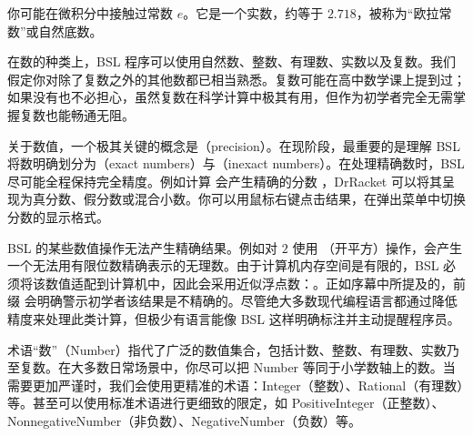 \begin{notebox}[常数 $e$（自然常数）]
你可能在微积分中接触过常数 $e$。它是一个实数，约等于 $2.718$，被称为“欧拉常数”或自然底数。
\end{notebox}

在数的种类上，BSL 程序可以使用自然数、整数、有理数、实数以及复数。我们假定你对除了复数之外的其他数都已相当熟悉。复数可能在高中数学课上提到过；如果没有也不必担心，虽然复数在科学计算中极其有用，但作为初学者完全无需掌握复数也能畅通无阻。

关于数值，一个极其关键的概念是（precision）。在现阶段，最重要的是理解 BSL 将数明确划分为（exact numbers）与（inexact numbers）。在处理精确数时，BSL 尽可能全程保持完全精度。例如计算  会产生精确的分数 ，DrRacket 可以将其呈现为真分数、假分数或混合小数。你可以用鼠标右键点击结果，在弹出菜单中切换分数的显示格式。

BSL 的某些数值操作无法产生精确结果。例如对 $2$ 使用 （开平方）操作，会产生一个无法用有限位数精确表示的无理数。由于计算机内存空间是有限的，BSL 必须将该数值适配到计算机中，因此会采用近似浮点数：。正如序幕中所提及的，前缀  会明确警示初学者该结果是不精确的。尽管绝大多数现代编程语言都通过降低精度来处理此类计算，但极少有语言能像 BSL 这样明确标注并主动提醒程序员。

\begin{notebox}[关于数的术语说明]
术语“数”（Number）指代了广泛的数值集合，包括计数、整数、有理数、实数乃至复数。在大多数日常场景中，你尽可以把 Number 等同于小学数轴上的数。当需要更加严谨时，我们会使用更精准的术语：Integer（整数）、Rational（有理数）等。甚至可以使用标准术语进行更细致的限定，如 PositiveInteger（正整数）、NonnegativeNumber（非负数）、NegativeNumber（负数）等。
\end{notebox}

